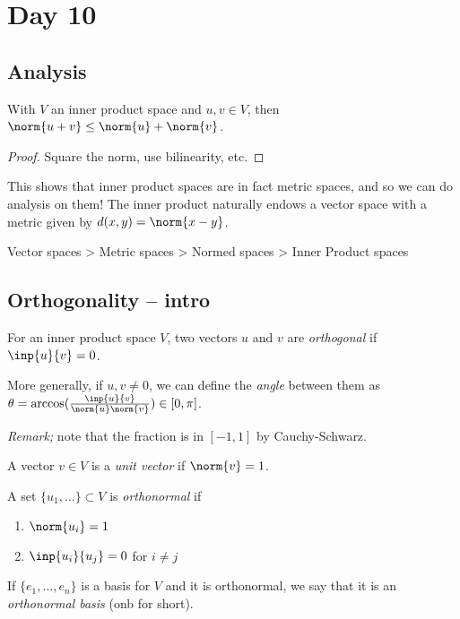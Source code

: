 
\pagebreak
\section{Day 10}

\subsection{Analysis}

\begin{theorem}
  With $V$ an inner product space and $u,v\in V$, then $\norm{u+v}\leq \norm{u}+\norm{v}$.
\end{theorem}
\begin{proof}
  Square the norm, use bilinearity, etc.
\end{proof}

This shows that inner product spaces are in fact metric spaces, and so we can do analysis on them! The inner product naturally endows a vector space with a metric given by $d(x,y)=\norm{x-y}$.

Vector spaces > Metric spaces > Normed spaces > Inner Product spaces

\subsection{Orthogonality -- intro}

\begin{definition}
  For an inner product space $V$, two vectors $u$ and $v$ are \emph{orthogonal} if $\inp{u}{v}=0$.

  More generally, if $u,v\neq0$, we can define the \emph{angle} between them as $\theta=\arccos(\frac{\inp{u}{v}}{\norm{u}\norm{v}})\in[0,\pi]$.
\end{definition}

\emph{Remark;} note that the fraction is in $[-1,1]$ by Cauchy-Schwarz.

\begin{definition}
  A vector $v\in V$ is a \emph{unit vector} if $\norm{v}=1$.
\end{definition}
\begin{definition}
  A set $\{u_1,\dots\}\subset V$ is \emph{orthonormal} if
  \begin{enumerate}[(1)]
    \item $\norm{u_i}=1$
    \item $\inp{u_i}{u_j} = 0$ for $i\neq j$
  \end{enumerate}

  If $\{e_1,\dots,e_n\}$ is a basis for $V$ and it is orthonormal, we say that it is an \emph{orthonormal basis} (onb for short).
\end{definition}



